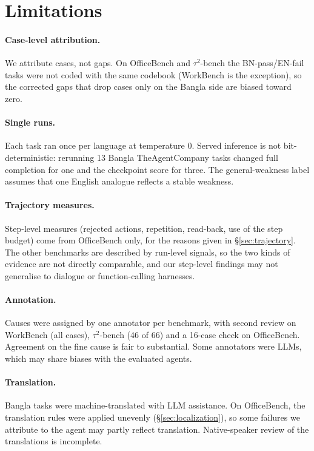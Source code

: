 \documentclass[11pt]{article}
\newcommand{\OB}{OfficeBench}
\newcommand{\WB}{WorkBench}
\newcommand{\TAU}{$\tau^2$-bench}
\newcommand{\TAC}{TheAgentCompany}
\begin{document}
\section*{Limitations}

\paragraph{Case-level attribution.} We attribute cases, not gaps. On \OB{} and \TAU{} the
BN-pass/EN-fail tasks were not coded with the same codebook (\WB{} is the exception), so the
corrected gaps that drop cases only on the Bangla side are biased toward zero.

\paragraph{Single runs.} Each task ran once per language at temperature 0. Served inference is
not bit-deterministic: rerunning 13 Bangla \TAC{} tasks changed full completion for one and the
checkpoint score for three. The
general-weakness label assumes that one English analogue reflects a stable weakness.

\paragraph{Trajectory measures.} Step-level measures (rejected actions, repetition, read-back,
use of the step budget) come from \OB{} only, for the reasons given in \S\ref{sec:trajectory}. The
other benchmarks are described by run-level signals, so the two kinds of evidence are not directly
comparable, and our step-level findings may not generalise to dialogue or function-calling
harnesses.

\paragraph{Annotation.} Causes were assigned by one annotator per benchmark, with second review on
\WB{} (all cases), \TAU{} (46 of 66) and a 16-case check on \OB{}. Agreement on the fine cause is
fair to substantial. Some annotators were LLMs, which may share biases with the evaluated agents.

\paragraph{Translation.} Bangla tasks were machine-translated with LLM assistance. On \OB{}, the
translation rules were applied unevenly (\S\ref{sec:localization}), so some failures we attribute
to the agent may partly reflect translation. Native-speaker review of the translations is
incomplete.
\end{document}
